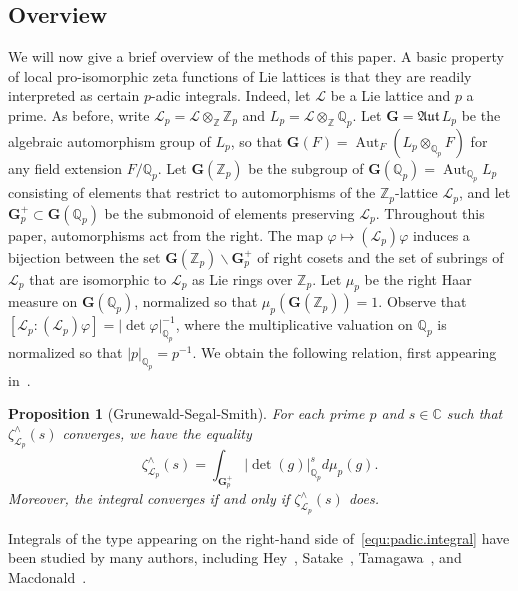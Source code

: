 \documentclass[11pt,a4paper]{amsart}
\theoremstyle{plain}
\newtheorem{pro}[thm]{Proposition}
\theoremstyle{remark}
\newcommand{\Z}{\mathbb{Z}}
\newcommand{\Q}{\mathbb{Q}}
\newcommand{\tensor}{\otimes}
\DeclareMathOperator{\Aut}{Aut}
\def \aAut {\mathfrak{Aut} \,}
\begin{document}
\subsection{Overview} \label{sec:Overview}
We will now give a brief overview of the methods of this paper.  A basic property of local pro-isomorphic zeta functions of Lie lattices is that they are readily interpreted as certain $p$-adic integrals.  
Indeed, let $\mathcal{L}$ be a Lie lattice and $p$ a prime.  As before, write $\mathcal{L}_p = \mathcal{L} \tensor_\Z \Z_p$ and $L_p = \mathcal{L} \tensor_\Z \Q_p$.  Let $\mathbf{G} = \aAut L_p$ be the algebraic automorphism group of $L_p$, so that $\mathbf{G}(F) = \Aut_F (L_p \tensor_{\Q_p} F)$ for any field extension $F/\Q_p$.  Let $\mathbf{G}(\Z_p)$ be the subgroup of $\mathbf{G}(\Q_p) = \Aut_{\Q_p} L_p$ consisting of elements that restrict to automorphisms of the $\Z_p$-lattice $\mathcal{L}_p$, and let $\mathbf{G}_p^+ \subset \mathbf{G}(\Q_p)$ be the submonoid of elements preserving $\mathcal{L}_p$.  Throughout this paper, automorphisms act from the right.  The map $\varphi \mapsto (\mathcal{L}_p)\varphi$ induces a bijection between the set $\mathbf{G}(\Z_p) \backslash \mathbf{G}_p^+$ of right cosets and the set of subrings of $\mathcal{L}_p$ that are isomorphic to $\mathcal{L}_p$ as Lie rings over $\Z_p$.  Let $\mu_p$ be the right Haar measure on $\mathbf{G}(\Q_p)$, normalized so that $\mu_p(\mathbf{G}(\Z_p)) = 1$.  Observe that $[ \mathcal{L}_p : (\mathcal{L}_p)\varphi] = | \det \varphi |_{\Q_p}^{-1}$, where the multiplicative valuation on $\Q_p$ is normalized so that $|p|_{\Q_p} = p^{-1}$.  We obtain the following relation, first appearing in~\cite[Proposition 3.4]{GSS/88}.

\begin{pro}[Grunewald-Segal-Smith] \label{pro:padic.integral}
For each prime $p$ and $s \in \mathbb{C}$ such that $\zeta^\wedge_{\mathcal{L}_p}(s)$ converges, we have the equality
\begin{equation} \label{equ:padic.integral}
\zeta^\wedge_{\mathcal{L}_p} (s) = \int_{\mathbf{G}_p^+} | \det (g) |_{\Q_p}^{s} d \mu_p (g).
\end{equation}
Moreover, the integral converges if and only if $\zeta^\wedge_{\mathcal{L}_p}(s)$ does.
\end{pro}
Integrals of the type appearing on the right-hand side of~\eqref{equ:padic.integral} have been studied by many authors, including Hey~\cite{Hey/29}, Satake~\cite{Satake/63}, Tamagawa~\cite{Tamagawa/63}, and Macdonald~\cite{Macdonald/95}. 
\end{document}

